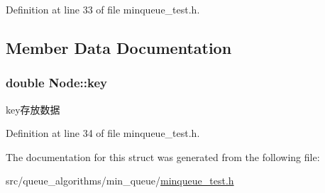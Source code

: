 Definition at line 33 of file minqueue\+\_\+test.\+h.



\subsection{Member Data Documentation}
\hypertarget{struct_node_afcabbedc2b739455060451607c6344e4}{}
\subsubsection[{key}]{\setlength{\rightskip}{0pt plus 5cm}double Node\+::key}\label{struct_node_afcabbedc2b739455060451607c6344e4}
key存放数据 

Definition at line 34 of file minqueue\+\_\+test.\+h.



The documentation for this struct was generated from the following file\+:\begin{DoxyCompactItemize}
\item 
src/queue\+\_\+algorithms/min\+\_\+queue/\hyperlink{minqueue__test_8h}{minqueue\+\_\+test.\+h}\end{DoxyCompactItemize}
